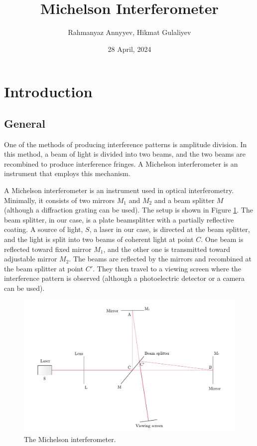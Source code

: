 \documentclass[10pt]{article}
\title{Michelson Interferometer}
\author{Rahmanyaz Annyyev, Hikmat Gulaliyev}
\date{28 April, 2024}
\begin{document}
\maketitle

\begin{abstract}
  
\end{abstract}

\section{Introduction}

\subsection*{General}

One of the methods of producing interference patterns is amplitude division. In this method, a beam of light is divided into two beams, and the two beams are recombined to produce interference fringes. A Michelson interferometer is an instrument that employs this mechanism.

A Michelson interferometer is an instrument used in optical interferometry. Minimally, it consists of two mirrors $M_1$ and $M_2$ and a beam splitter $M$ (although a diffraction grating can be used). The setup is shown in Figure \ref{fig:1}. The beam splitter, in our case, is a plate beamsplitter with a partially reflective coating. A source of light, $S$, a laser in our case, is directed at the beam splitter, and the light is split into two beams of coherent light at point $C$. One beam is reflected toward fixed mirror $M_1$, and the other one is transmitted toward adjustable mirror $M_2$. The beams are reflected by the mirrors and recombined at the beam splitter at point $C'$. They then travel to a viewing screen where the interference pattern is observed (although a photoelectric detector or a camera can be used).

\begin{figure}[hbt!]
  \centering
  \includegraphics[scale=0.6]{figures/f1.pdf}
  \caption{The Michelson interferometer.}
  \label{fig:1}
\end{figure}
\end{document}
